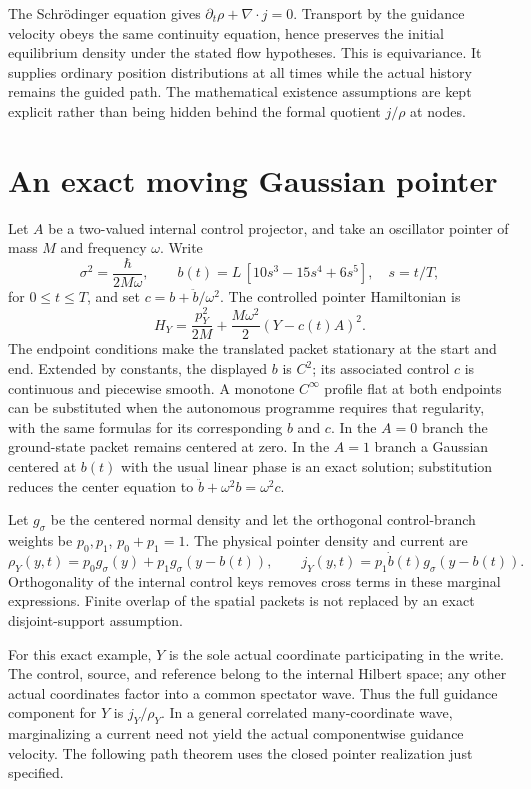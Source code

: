 The Schr\"odinger equation gives $\partial_t\rho+\nabla\cdot j=0$. Transport by the guidance velocity obeys the same continuity equation, hence preserves the initial equilibrium density under the stated flow hypotheses. This is equivariance. It supplies ordinary position distributions at all times while the actual history remains the guided path. The mathematical existence assumptions are kept explicit rather than being hidden behind the formal quotient $j/\rho$ at nodes.

\section{An exact moving Gaussian pointer}\label{section:massive:an-exact-moving-gaussian-pointer}
Let $A$ be a two-valued internal control projector, and take an oscillator pointer of mass $M$ and frequency $\omega$. Write
\[
\sigma^2=\frac{\hbar}{2M\omega},\qquad
b(t)=L\,[10s^3-15s^4+6s^5],\quad s=t/T,
\]
for $0\le t\le T$, and set $c=b+\ddot b/\omega^2$. The controlled pointer Hamiltonian is
\begin{equation}\label{eq:pointerH}
H_Y=\frac{p_Y^2}{2M}+\frac{M\omega^2}{2}(Y-c(t)A)^2.
\end{equation}
The endpoint conditions make the translated packet stationary at the start and end. Extended by constants, the displayed $b$ is $C^2$; its associated control $c$ is continuous and piecewise smooth. A monotone $C^\infty$ profile flat at both endpoints can be substituted when the autonomous programme requires that regularity, with the same formulas for its corresponding $b$ and $c$. In the $A=0$ branch the ground-state packet remains centered at zero. In the $A=1$ branch a Gaussian centered at $b(t)$ with the usual linear phase is an exact solution; substitution reduces the center equation to $\ddot b+\omega^2b=\omega^2c$.

Let $g_\sigma$ be the centered normal density and let the orthogonal control-branch weights be $p_0,p_1$, $p_0+p_1=1$. The physical pointer density and current are
\begin{equation}\label{eq:pointerrho}
\rho_Y(y,t)=p_0g_\sigma(y)+p_1g_\sigma(y-b(t)),\qquad
j_Y(y,t)=p_1\dot b(t)g_\sigma(y-b(t)).
\end{equation}
Orthogonality of the internal control keys removes cross terms in these marginal expressions. Finite overlap of the spatial packets is not replaced by an exact disjoint-support assumption.

For this exact example, $Y$ is the sole actual coordinate participating in the write. The control, source, and reference belong to the internal Hilbert space; any other actual coordinates factor into a common spectator wave. Thus the full guidance component for $Y$ is $j_Y/\rho_Y$. In a general correlated many-coordinate wave, marginalizing a current need not yield the actual componentwise guidance velocity. The following path theorem uses the closed pointer realization just specified.

